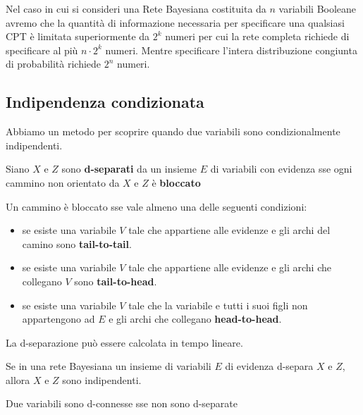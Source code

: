 Nel caso in cui si consideri una Rete Bayesiana costituita da $n$ variabili
Booleane avremo che la quantità di informazione necessaria per specificare una
qualsiasi CPT è limitata superiormente da $2^k$ numeri per cui la rete completa
richiede di specificare al più $n \cdot 2^k$ numeri. Mentre specificare l'intera
distribuzione congiunta di probabilità richiede $2^n$ numeri.

\subsection{Indipendenza condizionata}
Abbiamo un metodo per scoprire quando due variabili sono condizionalmente 
indipendenti.

\begin{definizione}
    Siano $X$ e $Z$ sono \textbf{d-separati} da un insieme $E$ di variabili con 
    evidenza sse ogni cammino non orientato da $X$ e $Z$ è \textbf{bloccato}
\end{definizione}
\begin{definizione}
    Un cammino è bloccato sse vale almeno una delle seguenti condizioni:
    \begin{itemize}
        \item se esiste una variabile $V$ tale che appartiene alle evidenze e gli archi
              del camino sono \textbf{tail-to-tail}.
        \item se esiste una variabile $V$ tale che appartiene alle evidenze e  gli archi
              che collegano $V$ sono \textbf{tail-to-head}.
        \item se esiste una variabile $V$ tale che la variabile e tutti i suoi figli
              non appartengono ad $E$ e gli archi che collegano \textbf{head-to-head}.
    \end{itemize}
\end{definizione}

La d-separazione può essere calcolata in tempo lineare. 

\begin{teorema} 
    Se in una rete Bayesiana un insieme di variabili $E$ di evidenza d-separa $X$ e $Z$,
    allora $X$ e $Z$ sono indipendenti.
\end{teorema}

\begin{definizione}
    Due variabili sono d-connesse sse non sono d-separate
\end{definizione}

